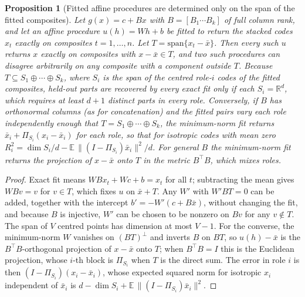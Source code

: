 \documentclass[10pt]{article}
\theoremstyle{plain}
\newtheorem{proposition}{Proposition}
\theoremstyle{remark}
\newcommand{\R}{\mathbb{R}}
\begin{document}
\begin{proposition}[Fitted affine procedures are determined only on the span of the fitted composites]
\label{prop:span}
Let $g(x) = c + Bx$ with $B = [B_1 \cdots B_k]$ of full column rank, and let an affine procedure $u(h) = Wh + b$ be fitted to return the stacked codes $x_t$ exactly on composites $t = 1, \ldots, n$. Let $T = \mathrm{span}\{x_t - \bar{x}\}$. Then every such $u$ returns $x$ exactly on composites with $x - \bar{x} \in T$, and two such procedures can disagree arbitrarily on any composite with a component outside $T$. Because $T \subseteq S_1 \oplus \cdots \oplus S_k$, where $S_i$ is the span of the centred role-$i$ codes of the fitted composites, held-out parts are recovered by every exact fit only if each $S_i = \R^d$, which requires at least $d + 1$ distinct parts in every role. Conversely, if $B$ has orthonormal columns (as for concatenation) and the fitted pairs vary each role independently enough that $T = S_1 \oplus \cdots \oplus S_k$, the minimum-norm fit returns $\bar{x}_i + \Pi_{S_i}(x_i - \bar{x}_i)$ for each role, so that for isotropic codes with mean zero $R^2_i = \dim S_i/d - \mathbb{E}\,\lVert (I - \Pi_{S_i})\bar{x}_i \rVert^2/d$. For general $B$ the minimum-norm fit returns the projection of $x - \bar{x}$ onto $T$ in the metric $B^{\top}B$, which mixes roles.
\end{proposition}

\begin{proof}
Exact fit means $WBx_t + Wc + b = x_t$ for all $t$; subtracting the mean gives $WBv = v$ for $v \in T$, which fixes $u$ on $\bar{x} + T$. Any $W'$ with $W'BT = 0$ can be added, together with the intercept $b' = -W'(c + B\bar{x})$, without changing the fit, and because $B$ is injective, $W'$ can be chosen to be nonzero on $B v$ for any $v \notin T$. The span of $V$ centred points has dimension at most $V - 1$. For the converse, the minimum-norm $W$ vanishes on $(BT)^{\perp}$ and inverts $B$ on $BT$, so $u(h) - \bar{x}$ is the $B^{\top}B$-orthogonal projection of $x - \bar{x}$ onto $T$; when $B^{\top}B = I$ this is the Euclidean projection, whose $i$-th block is $\Pi_{S_i}$ when $T$ is the direct sum. The error in role $i$ is then $(I - \Pi_{S_i})(x_i - \bar{x}_i)$, whose expected squared norm for isotropic $x_i$ independent of $\bar{x}_i$ is $d - \dim S_i + \mathbb{E}\,\lVert (I - \Pi_{S_i})\bar{x}_i \rVert^2$.
\end{proof}
\end{document}
